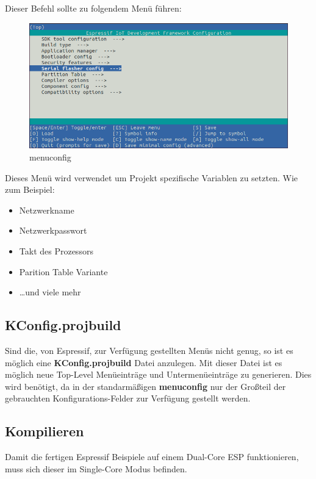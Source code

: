 Dieser Befehl sollte zu folgendem Menü führen:
\begin{figure}[H]
    \begin{center}
        \includegraphics[scale=0.5]{images/menuconfig.png}
        \caption{menuconfig \cite{menuconfig_picture}}
    \end{center}
\end{figure}
Dieses Menü wird verwendet um Projekt spezifische Variablen zu setzten. Wie zum Beispiel:
\begin{itemize}
    \item Netzwerkname
    \item Netzwerkpasswort
    \item Takt des Prozessors
    \item Parition Table Variante
    \item \dots und viele mehr
\end{itemize}

\subsection{KConfig.projbuild}\label{sec:esp-idf-projbuild}
Sind die, von Espressif, zur Verfügung gestellten Menüs nicht genug, so ist es möglich eine \textbf{KConfig.projbuild} Datei anzulegen. Mit dieser Datei ist es möglich neue Top-Level Menüeinträge und Untermenüeinträge zu generieren. Dies wird benötigt, da in der standarmäßigen \textbf{menuconfig} nur der Großteil der gebrauchten Konfigurations-Felder zur Verfügung gestellt werden.

\subsection{Kompilieren}
Damit die fertigen Espressif Beispiele auf einem Dual-Core ESP funktionieren, muss sich dieser im Single-Core Modus befinden.

